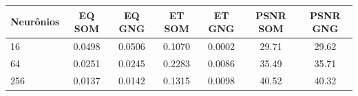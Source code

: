 \begin{tabular}{lcccccc}
\toprule
Neurônios & EQ SOM & EQ GNG & ET SOM & ET GNG & PSNR SOM & PSNR GNG\\
\midrule
16 & 0.0498 & 0.0506 & 0.1070 & 0.0002 & 29.71 & 29.62\\
64 & 0.0251 & 0.0245 & 0.2283 & 0.0086 & 35.49 & 35.71\\
256 & 0.0137 & 0.0142 & 0.1315 & 0.0098 & 40.52 & 40.32\\
\bottomrule
\end{tabular}
